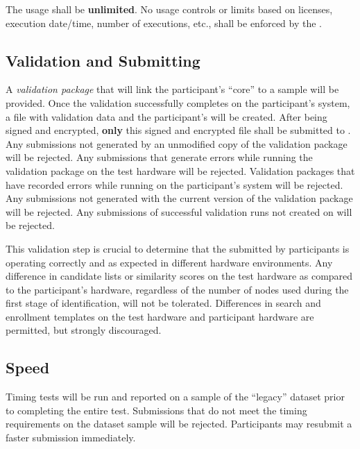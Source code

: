 The \lib usage shall be \textbf{unlimited}. No usage controls or limits based
on licenses, execution date/time, number of executions, etc., shall be enforced
by the \lib.

\subsection{Validation and Submitting}
\label{subsec:software-validation}

A \textit{validation package} that will link the participant's ``core''
\lib to a sample \testdriver will be provided. Once the validation successfully
completes on the participant's system, a file with validation data and the
participant's \lib will be created. After being signed and encrypted,
\textbf{only} this signed and encrypted file shall be submitted
to \emailaddress. Any \lib submissions not generated by an unmodified copy of
the \project validation package will be rejected. Any \lib submissions that
generate errors while running the validation package on the test hardware will
be rejected. Validation packages that have recorded errors while running on the
participant's system will be rejected. Any \lib submissions not generated with
the current version of the validation package will be rejected. Any submissions
of successful validation runs not created on \os will be rejected.

This validation step is crucial to determine that the \lib submitted by
participants is operating correctly and as expected in different hardware
environments. Any difference in candidate lists or similarity scores on the test
hardware as compared to the participant's hardware, regardless of the number of
nodes used during the first stage of identification, will not be tolerated.
Differences in search and enrollment templates on the test hardware and
participant hardware are permitted, but strongly discouraged.

\subsection{Speed}
\label{subsec:software-speed}

Timing tests will be run and reported on a sample of the ``legacy'' dataset
prior to completing the entire test. Submissions that do not meet the timing
requirements on the dataset sample will be rejected. Participants may resubmit a
faster submission immediately.

